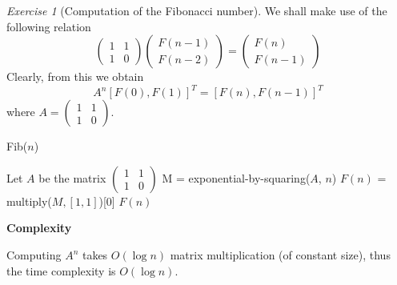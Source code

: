 \documentclass[a4paper,10pt,twoside]{article}
\theoremstyle{plain}
\theoremstyle{definition}
\theoremstyle{remark}
\theoremstyle{exercise}
\newtheorem{exercise}{Exercise}
\begin{document}
\begin{exercise}[Computation of the Fibonacci number]
We shall make use of the following relation
\begin{equation}
	\begin{pmatrix}
		1 & 1\\ 1 & 0
	\end{pmatrix}
	\begin{pmatrix}F(n-1)\\F(n-2)\end{pmatrix}
	= \begin{pmatrix}F(n)\\F(n-1)\end{pmatrix}
\end{equation}
Clearly, from this we obtain
\begin{equation}
	A^n [F(0), F(1)]^T = [F(n), F(n-1)]^T
\end{equation}
where $A = \begin{pmatrix}1 & 1\\ 1 & 0\end{pmatrix}$.

\begin{algorithm}[H]
	\caption{Fib($n$)}
	Let $A$ be the matrix $\begin{pmatrix}1 & 1\\ 1 & 0\end{pmatrix}$\;
	M = exponential-by-squaring($A$, $n$)\;
	$F(n)$ = multiply($M,[1, 1]$)[0]\;
	\Return $F(n)$
\end{algorithm}


\textbf{Complexity}

Computing $A^n$ takes $O(\log n)$ matrix multiplication (of constant
size), thus the time complexity is $O(\log n)$.
\end{exercise}
\end{document}
